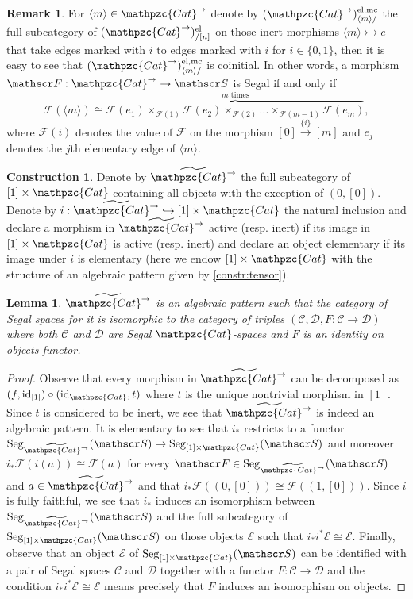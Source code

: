 \documentclass[a4paper, reqno]{amsart}
\newtheorem{lemma}[theorem]{Lemma}
\theoremstyle{definition}
\newtheorem{remark}[theorem]{Remark}
\newtheorem{construction}[theorem]{Construction}
\newcommand\cC{\mathscr C}
\newcommand\cD{\mathscr D}
\newcommand\cE{\mathscr E}
\newcommand\cF{\mathscr F}
\newcommand\cS{\mathscr S}
\newcommand\mc{\mathrm{mc}}
\newcommand\id{\mathrm{id}}
\newcommand\ccat{\mathpzc{Cat}}
\newcommand\bm{\langle m\rangle}
\newcommand\el{\mathrm{el}}
\newcommand\seg{\mathrm{Seg}}
\begin{document}
\begin{remark}\label{rem:seg_cat}
For $\bm\in\ccat^\rightarrow$ denote by $(\ccat^\rightarrow)^{\el,\mc}_{\bm/}$ the full subcategory of $(\ccat^\rightarrow)^\el_{/[n]}$ on those inert morphisms $\bm\rightarrowtail e$ that take edges marked with $i$ to edges marked with $i$ for $i\in\{0,1\}$, then it is easy to see that $(\ccat^\rightarrow)^{\el,\mc}_{\bm/}$ is coinitial. In other words, a morphism $\cF:\ccat^\rightarrow\rightarrow\cS$ is Segal if and only if
\[\cF(\bm)\cong\overbrace{\cF(e_1)\times_{\cF(1)}\cF(e_2)\times_{\cF(2)}...\times_{\cF(m-1)}\cF(e_m)}^\text{$m$ times},\]
where $\cF(i)$ denotes the value of $\cF$ on the morphism $[0]\xrightarrow{\{i\}}[m]$ and $e_j$ denotes the $j$th elementary edge of $\bm$.
\end{remark}
\begin{construction}
Denote by $\widetilde{\ccat^\rightarrow}$ the full subcategory of $[1]\times\ccat$ containing all objects with the exception of $(0,[0])$. Denote by $i:\widetilde{\ccat^\rightarrow}\hookrightarrow[1]\times\ccat$ the natural inclusion and declare a morphism in $\widetilde{\ccat^\rightarrow}$ active (resp. inert) if its image in $[1]\times \ccat$ is active (resp. inert) and declare an object elementary if its image under $i$ is elementary (here we endow $[1]\times \ccat$ with the structure of an algebraic pattern given by \cref{constr:tensor}).
\end{construction}
\begin{lemma}\label{lem:pat_bo}
$\widetilde{\ccat^\rightarrow}$ is an algebraic pattern such that the category of Segal spaces for it is isomorphic to the category of triples $(\cC,\cD,F:\cC\rightarrow\cD)$ where both $\cC$ and $\cD$ are Segal $\ccat$-spaces and $F$ is an identity on objects functor.
\end{lemma}
\begin{proof}
Observe that every morphism in $\widetilde{\ccat^\rightarrow}$ can be decomposed as $(f,\id_{[1]})\circ (\id_\ccat,t)$ where $t$ is the unique nontrivial morphism in $[1]$. Since $t$ is considered to be inert, we see that $\widetilde{\ccat^\rightarrow}$ is indeed an algebraic pattern. It is elementary to see that $i_*$ restricts to a functor $\seg_{\widetilde{\ccat^\rightarrow}}(\cS)\rightarrow\seg_{[1]\times\ccat}(\cS)$ and moreover $i_*\cF(i(a))\cong\cF(a)$ for every $\cF\in\seg_{\widetilde{\ccat^\rightarrow}}(\cS)$ and $a\in\widetilde{\ccat^\rightarrow}$ and that $i_*\cF((0,[0]))\cong\cF((1,[0]))$. Since $i$ is fully faithful, we see that $i_*$ induces an isomorphism between $\seg_{\widetilde{\ccat^\rightarrow}}(\cS)$ and the full subcategory of $\seg_{[1]\times\ccat}(\cS)$ on those objects $\cE$ such that $i_*i^*\cE\cong\cE$. Finally, observe that an object $\cE$ of $\seg_{[1]\times\ccat}(\cS)$ can be identified with a pair of Segal spaces $\cC$ and $\cD$ together with a functor $F:\cC\rightarrow\cD$ and the condition $i_*i^*\cE\cong\cE$ means precisely that $F$ induces an isomorphism on objects.
\end{proof}
\end{document}
